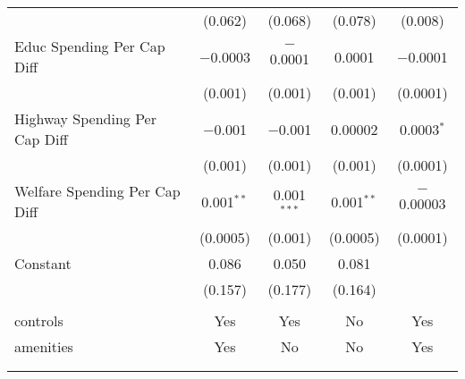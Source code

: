 \begin{table}[!htbp]
\begin{tabular}{@{\extracolsep{5pt}}lcccc}
  & (0.062) & (0.068) & (0.078) & (0.008) \\ 
  Educ Spending Per Cap Diff & $-$0.0003 & $-$0.0001 & 0.0001 & $-$0.0001 \\ 
  & (0.001) & (0.001) & (0.001) & (0.0001) \\ 
  Highway Spending Per Cap Diff & $-$0.001 & $-$0.001 & 0.00002 & 0.0003$^{*}$ \\ 
  & (0.001) & (0.001) & (0.001) & (0.0001) \\ 
  Welfare Spending Per Cap Diff & 0.001$^{**}$ & 0.001$^{***}$ & 0.001$^{**}$ & $-$0.00003 \\ 
  & (0.0005) & (0.001) & (0.0005) & (0.0001) \\ 
  Constant & 0.086 & 0.050 & 0.081 &  \\ 
  & (0.157) & (0.177) & (0.164) &  \\ 
 \hline \\[-1.8ex] 
controls & Yes & Yes & No & Yes \\ 
amenities & Yes & No & No & Yes \\ 
\hline \\[-1.8ex] 
\hline 
\hline \\[-1.8ex] 
\end{tabular} 
\end{table} 
